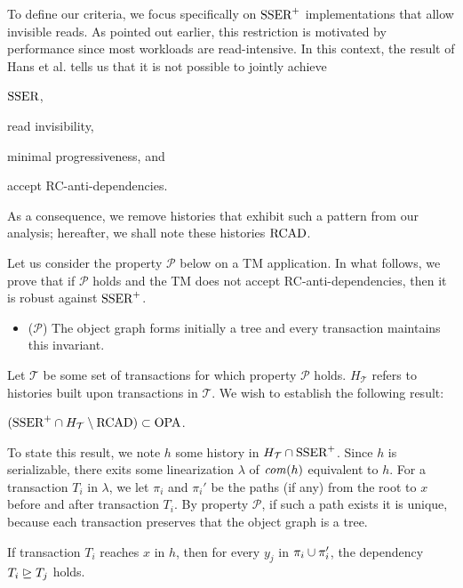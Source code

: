 To define our criteria, we focus specifically on $\SPSER$ implementations that allow invisible reads.
As pointed out earlier, this restriction is motivated by performance since most workloads are read-intensive.
In this context, the result of Hans et al. \cite{hans16} tells us that it is not possible to jointly achieve
\begin{inparaenum}
\item $\SSER$,
\item read invisibility,
\item minimal progressiveness, and
\item accept RC-anti-dependencies.
\end{inparaenum}
As a consequence, we remove histories that exhibit such a pattern from our analysis;
hereafter, we shall note these histories $\RCAD$.

Let us consider the property $\mathcal{P}$ below on a TM application.
In what follows, we prove that if $\mathcal{P}$ holds and the TM does not accept RC-anti-dependencies, then it is robust against $\SPSER$.
\begin{itemize}
  \item($\mathcal{P}$) The object graph forms initially a tree and every transaction maintains this invariant.
\end{itemize}
Let $\mathcal{T}$ be some set of transactions for which property $\mathcal{P}$ holds.
$H_{\mathcal{T}}$ refers to histories built upon transactions in $\mathcal{T}$.
We wish to establish the following result:

\begin{proposition}
  $(\SPSER \inter H_{\mathcal{T}} \setminus \RCAD) \subset \OPA$.
\end{proposition}

To state this result, we note $h$ some history  in $H_{\mathcal{T}} \inter \SPSER$.
Since $h$ is serializable, there exits some linearization $\lambda$ of $\committed{h}$ equivalent to $h$.
For a transaction $T_i$ in $\lambda$, we let $\pi_i$ and $\pi_i'$ be the paths (if any) from the root to $x$ before and after transaction $T_i$.
By property $\mathcal{P}$, if such a path exists it is unique, because each transaction preserves that the object graph is a tree.

\begin{lemma}
  If transaction $T_i$ reaches $x$ in $h$, then for every $y_j$ in $\pi_i \cup \pi_i'$, the dependency $T_i \mathrel{\unrhd} T_j$ holds.
\end{lemma}

